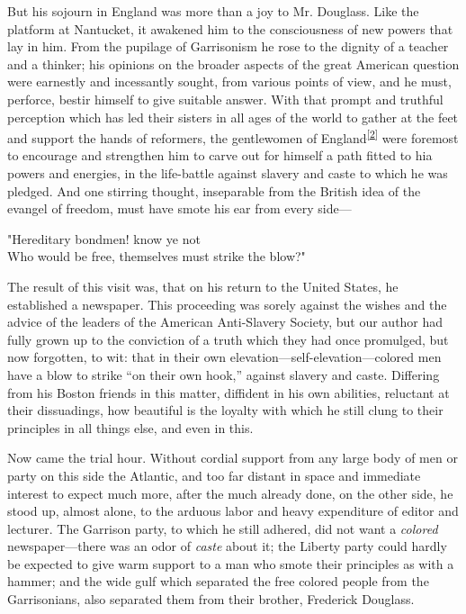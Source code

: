 But his sojourn in England was more than a joy to Mr. Douglass. Like the
platform at Nantucket, it awakened him to the consciousness of new
powers that lay in him. From the pupilage of Garrisonism he rose to the
dignity of a teacher and a thinker; his opinions on the broader aspects
of the great American question were earnestly and incessantly sought,
from various points of view, and he must, perforce, bestir himself to
give suitable answer. With that prompt and truthful perception which has
led their sisters in all ages of the world to gather at the feet and
support the hands of reformers, the gentlewomen of
England\textsuperscript{\protect\hyperlink{cite_note-2}{{[}2{]}}} were
foremost to encourage and strengthen him to carve out for himself a path
fitted to hia powers and energies, in the life-battle against slavery
and caste to which he was pledged. And one stirring thought, inseparable
from the British idea of the evangel of freedom, must have smote his ear
from every side---

{"}Hereditary bondmen! know ye not\\
Who would be free, themselves must strike the blow?"

The result of this visit was, that on his return to the United States,
he established a newspaper. This proceeding was sorely against the
wishes and the advice of the leaders of the American Anti-Slavery
Society, but our author had fully grown up to the conviction of a truth
which they had once promulged, but now forgotten, to wit: that in their
own elevation---self-elevation---colored men have a blow to strike ``on
their own hook,'' against slavery and caste. Differing from his Boston
friends in this matter, {\protect\hypertarget{xxiv}{}{}}diffident in his
own abilities, reluctant at their dissuadings, how beautiful is the
loyalty with which he still clung to their principles in all things
else, and even in this.

Now came the trial hour. Without cordial support from any large body of
men or party on this side the Atlantic, and too far distant in space and
immediate interest to expect much more, after the much already done, on
the other side, he stood up, almost alone, to the arduous labor and
heavy expenditure of editor and lecturer. The Garrison party, to which
he still adhered, did not want a \emph{colored} newspaper---there was an
odor of \emph{caste} about it; the Liberty party could hardly be
expected to give warm support to a man who smote their principles as
with a hammer; and the wide gulf which separated the free colored people
from the Garrisonians, also separated them from their brother, Frederick
Douglass.

